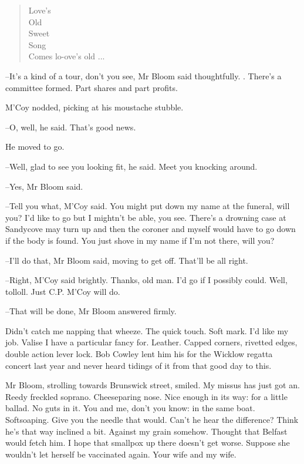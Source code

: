 \begin{verse}
    Love's \\
    Old \\
    Sweet \\
    Song \\
    Comes lo-ove's old ...
\end{verse}


--It's a kind of a tour,
don't you see,
Mr Bloom said thoughtfully.
.
There's a committee formed.
Part shares and part profits.

M'Coy nodded,
picking at his moustache stubble.

--O, well,
he said.
That's good news.

He moved to go.

--Well, glad to see you looking fit,
he said.
Meet you knocking around.

--Yes,
Mr Bloom said.

--Tell you what,
M'Coy said.
You might put down my name at the funeral,
will you?
I'd like to go but I mightn't be able, you see.
There's a drowning case at Sandycove may turn up
and then the coroner and myself would have to go down
if the body is found.
You just shove in my name if I'm not there,
will you?

--I'll do that,
Mr Bloom said,
moving to get off.
That'll be all right.

--Right, M'Coy said brightly.
Thanks, old man.
I'd go if I possibly could.
Well, tolloll.
Just C.P. M'Coy will do.

--That will be done,
Mr Bloom answered firmly.

Didn't catch me napping that wheeze.
The quick touch.
Soft mark.
I'd like my job.
Valise I have a particular fancy for.
Leather.
Capped corners,
rivetted edges,
double action lever lock.
Bob Cowley lent him his for the Wicklow regatta concert last year
and never heard tidings of it from that good day to this.

Mr Bloom, strolling towards Brunswick street, smiled. My missus has just
got an. Reedy freckled soprano. Cheeseparing nose. Nice enough in its
way: for a little ballad. No guts in it. You and me, don't you know: in
the same boat. Softsoaping. Give you the needle that would. Can't he hear
the difference? Think he's that way inclined a bit. Against my grain
somehow. Thought that Belfast would fetch him. I hope that smallpox up
there doesn't get worse. Suppose she wouldn't let herself be vaccinated
again. Your wife and my wife.

